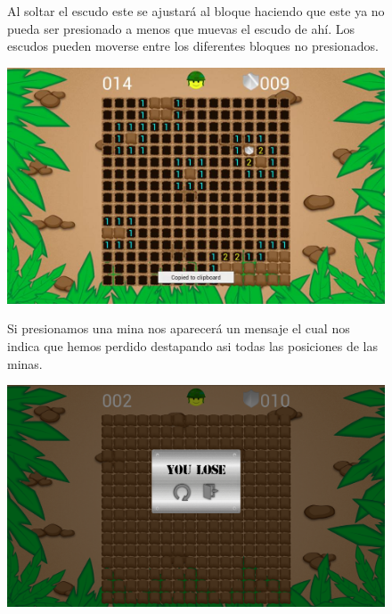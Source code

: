 \documentclass[11pt]{article}
\begin{document}
\begin{figure}[h!]
\begin{minipage}{0.5 \textwidth}
Al soltar el escudo este se ajustará al bloque haciendo que este ya no pueda ser presionado a menos que muevas el escudo de ahí. Los escudos pueden moverse entre los diferentes bloques no presionados.
\end{minipage}
\hfill \begin{minipage}{6.5cm}
\begin{center}
 \includegraphics[width=1\textwidth]{images/screenshot7}
\end{center}
\end{minipage}
\end{figure}

\begin{figure}[h!]
\begin{minipage}{0.5 \textwidth}
Si presionamos una mina nos aparecerá un mensaje el cual nos indica que hemos perdido destapando asi todas las posiciones de las minas.
\end{minipage}
\hfill \begin{minipage}{6.5cm}
\begin{center}
 \includegraphics[width=1\textwidth]{images/screenshot8}
\end{center}
\end{minipage}
\end{figure}
\end{document}
